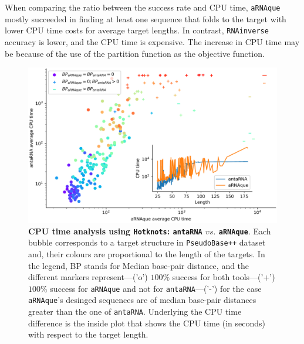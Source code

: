 When comparing the ratio between the success rate and \ac{CPU} time, \texttt{aRNAque}  mostly succeeded in finding at least one sequence that folds to the target with lower \ac{CPU} time costs for average target lengths. In contrast, \texttt{RNAinverse} accuracy is lower, and the \ac{CPU} time is expensive. The increase in \ac{CPU} time may be because of the use of the partition function as the objective function.


\begin{figure}[t!]
	\centering
	\includegraphics[width=1.0\linewidth]{../res/images/arnaque/CPU_time_Hotknots.pdf}
	\caption{\textbf{\ac{CPU} time analysis using \texttt{Hotknots}: \texttt{antaRNA} $vs.$ \texttt{aRNAque}}. Each bubble corresponds to a target structure in \texttt{PseudoBase++} dataset and, their colours are proportional to the length of the targets. In the legend, BP stands for Median base-pair distance, and the different markers represent---('o') $100\%$ success for both tools---('+') $100\%$ success for \texttt{aRNAque} and not for \texttt{antaRNA}---('-') for the case \texttt{aRNAque}'s desinged sequences are of median base-pair distances greater than the one of \texttt{antaRNA}. Underlying the \ac{CPU} time difference is the inside plot that shows the \ac{CPU} time (in seconds) with respect to the target length.}
	\label{fig:cputime_hotknots}
\end{figure}

